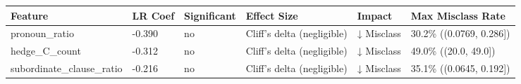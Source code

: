 \begin{tabular}{llllll}
\toprule
Feature & LR Coef & Significant & Effect Size & Impact & Max Misclass Rate \\
\midrule
pronoun\_ratio & -0.390 & no & Cliff's delta (negligible) & ↓ Misclass & 30.2\% ((0.0769, 0.286]) \\
hedge\_C\_count & -0.312 & no & Cliff's delta (negligible) & ↓ Misclass & 49.0\% ((20.0, 49.0]) \\
subordinate\_clause\_ratio & -0.216 & no & Cliff's delta (negligible) & ↓ Misclass & 35.1\% ((0.0645, 0.192]) \\
\bottomrule
\end{tabular}
